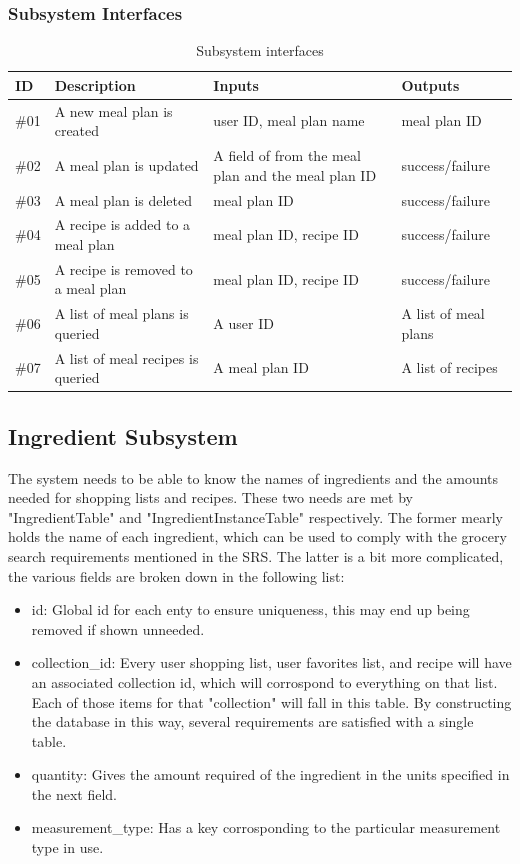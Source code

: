 \subsubsection{Subsystem Interfaces}
\begin {table}[H]
\caption {Subsystem interfaces} 
\begin{center}
    \begin{tabular}{ | p{1cm} | p{6cm} | p{3cm} | p{3cm} |}
    \hline
    ID & Description & Inputs & Outputs \\ \hline
    \#01 & A new meal plan is created & user ID, meal plan name & meal plan ID  \\ \hline
    \#02 & A meal plan is updated & A field of from the meal plan and the meal plan ID & success/failure  \\ \hline
    \#03 & A meal plan is deleted & meal plan ID & success/failure  \\ \hline
    \#04 & A recipe is added to a meal plan & meal plan ID, recipe ID & success/failure  \\ \hline
    \#05 & A recipe is removed to a meal plan & meal plan ID, recipe ID & success/failure  \\ \hline
    \#06 & A list of meal plans is queried & A user ID & A list of meal plans  \\ \hline
    \#07 & A list of meal recipes is queried & A meal plan ID & A list of recipes  \\ \hline
    \end{tabular}
\end{center}
\end{table}


\subsection{Ingredient Subsystem}\label{section:db.3}
The system needs to be able to know the names of ingredients and the amounts needed for shopping lists and recipes.  These two needs are met by "IngredientTable" and "IngredientInstanceTable" respectively.  The former mearly holds the name of each ingredient, which can be used to comply with the grocery search requirements mentioned in the SRS.  The latter is a bit more complicated, the various fields are broken down in the following list:
\begin{itemize}
    \item id: Global id for each enty to ensure uniqueness, this may end up being removed if shown unneeded.
    \item collection\_id: Every user shopping list, user favorites list, and recipe will have an associated collection id, which will corrospond to everything on that list.  Each of those items for that "collection" will fall in this table.  By constructing the database in this way, several requirements are satisfied with a single table.
    \item quantity: Gives the amount required of the ingredient in the units specified in the next field.
    \item measurement\_type: Has a key corrosponding to the particular measurement type in use.
\end{itemize}

